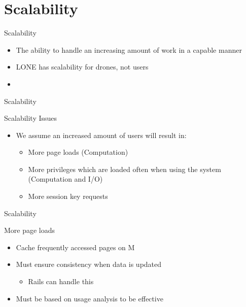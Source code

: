 \author{Esben Pilgaard M\o{}ller}

\section{Scalability}
\begin{frame}{Scalability}{}
  \begin{itemize}
  	\item The ability to handle an increasing amount of work in a capable manner
  	\item LONE has scalability for drones, not users
  	\item 
  \end{itemize}
\end{frame}


\begin{frame}{Scalability}{}
\begin{block}{Scalability Issues}
  \begin{itemize}
    \item We assume an increased amount of users will result in:
    \begin{itemize}
			\item More page loads (Computation)
			\item More privileges which are loaded often when using the system (Computation and I/O)
			\item More session key requests
		\end{itemize}
  \end{itemize}
\end{block}
\end{frame}

\begin{frame}{Scalability}{}
\begin{block}{More page loads}
  \begin{itemize}
    \item Cache frequently accessed pages on M
    \item Must ensure consistency when data is updated
    	\begin{itemize}
				\item Rails can handle this
			\end{itemize}
		\item Must be based on usage analysis to be effective
  \end{itemize}
\end{block}
\end{frame}

